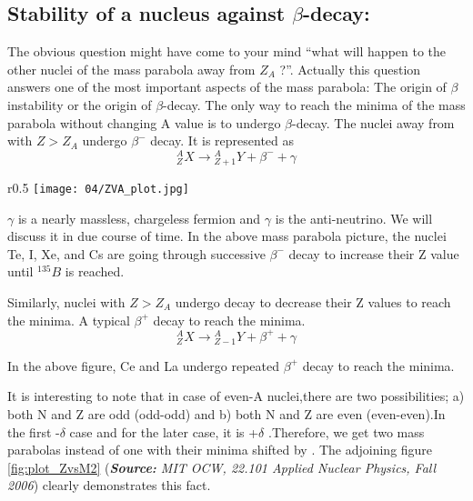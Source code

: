 \subsection{Stability of a nucleus against $\beta$-decay:}   The obvious question might have come to your mind “what will happen to the other nuclei of the mass parabola away from $Z_A $ ?”. Actually this question answers one of the most important aspects of the mass parabola: The origin of $\beta$ instability or the origin of $\beta$-decay. The only way to reach the minima of the mass parabola without changing A value is to undergo $\beta$-decay. The nuclei away from with $Z > Z_A$ undergo $\beta^-$ decay. It is represented as
     \begin{equation}
        {}^{A}_{Z}X  \longrightarrow {}^{A}_{Z+1}Y  + \beta^-+\gamma 
      \end{equation}
      
\begin{wrapfigure}{r}{0.5\textwidth}
    \texttt{[image: 04/ZVA\_plot.jpg]}
    \caption{Z vs M plot (for even A)}
    \label{fig:plot_ZvsM2}
\end{wrapfigure}

\par $\gamma$ is a nearly massless, chargeless fermion and $\gamma$ is the anti-neutrino. We will discuss it in due course of time. In the above mass parabola picture, the nuclei Te, I, Xe, and Cs are going through successive
$\beta^-{}$ decay to increase their Z value until ${}^{135}B $ is reached.

Similarly, nuclei with $ Z > Z_A $ undergo decay to decrease their Z values to reach the minima. A typical $\beta^+{}$ decay to reach the minima.
\begin{equation}
  {}^{A}_{Z}X \longrightarrow {}^{A}_{Z-1}Y  + \beta^+ + \gamma
\end{equation}

 In the above figure, Ce and La undergo repeated $\beta^+$ decay to reach the minima.
 
 It is interesting to note that in case of even-A nuclei,there are two possibilities; a) both N and Z are odd (odd-odd) and b) both N and Z are even (even-even).In the first -$\delta$ case and for the later case, it is +$\delta$ .Therefore, we get two mass parabolas instead of one with their minima shifted by . The adjoining figure \ref{fig:plot_ZvsM2}
({\textit{\textbf{Source:} MIT OCW, 22.101 Applied Nuclear Physics, Fall 2006}})
clearly demonstrates this fact.



